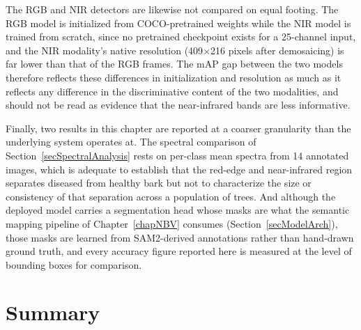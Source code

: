 The RGB and NIR detectors are likewise not compared on equal footing.
The RGB model is initialized from COCO-pretrained weights while the NIR
model is trained from scratch, since no pretrained checkpoint exists for a
25-channel input, and the NIR modality's native resolution
(409$\times$216 pixels after demosaicing) is far lower than that of the
RGB frames.
The mAP gap between the two models therefore reflects these differences in
initialization and resolution as much as it reflects any difference in the
discriminative content of the two modalities, and should not be read as
evidence that the near-infrared bands are less informative.

Finally, two results in this chapter are reported at a coarser granularity
than the underlying system operates at.
The spectral comparison of Section~\ref{secSpectralAnalysis} rests on
per-class mean spectra from 14 annotated images, which is adequate to
establish that the red-edge and near-infrared region separates diseased
from healthy bark but not to characterize the size or consistency of that
separation across a population of trees.
And although the deployed model carries a segmentation head whose masks are
what the semantic mapping pipeline of Chapter~\ref{chapNBV} consumes
(Section~\ref{secModelArch}), those masks are learned from SAM2-derived
annotations rather than hand-drawn ground truth, and every accuracy figure
reported here is measured at the level of bounding boxes for comparison.

\section{Summary} \label{secDatasetSummary}

